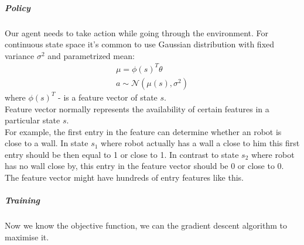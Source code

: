 \subparagraph{Policy} Our agent needs to take action while going through
the environment.
For continuous state space it's common to
use Gaussian distribution with fixed variance $\sigma^2$ and parametrized mean:
\begin{align} \label{eq:param_mean}
	\mu = \phi(s)^{T} \theta \\
	a \sim \mathcal{N}(\mu(s), \sigma^2)
\end{align}
where $\phi(s)^{T}$ - is a feature vector of state $s$. \\
Feature vector normally represents the availability of certain features in
a particular state $s$. \\
For example, the first entry in the feature can determine
whether an robot is close to a wall. In state $s_1$
where robot actually has a wall a close to him
this first entry should be then equal to 1 or close to 1.
In contrast to state $s_2$ where
robot has no wall close by, this entry in the feature vector
should be 0 or close to 0.
The feature vector might have hundreds of entry features like this.

\subparagraph{Training} Now we know the objective function, we can the gradient descent
algorithm to maximise it.



%







